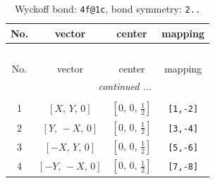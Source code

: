 \documentclass[fleqn,8pt]{jsarticle}
\begin{document}
\renewcommand{\arraystretch}{1.2}
\begin{longtable}{cccc}
\caption{Wyckoff bond: {\tt 4f@1c}, bond symmetry: {\tt 2..}}
 \\
 \hline \hline
No. & vector & center & mapping \\ \hline \endfirsthead

\multicolumn{3}{l}{\tablename\ \thetable{}} \\
 \hline \hline
No. & vector & center & mapping \\ \hline \endhead

 \hline \hline
\multicolumn{3}{r}{\footnotesize\it continued ...} \\ \endfoot

 \hline \hline
\multicolumn{3}{r}{} \\ \endlastfoot

1 & $\left[ X,\, Y,\, 0 \right]$ & $\left[ 0,\, 0,\, \frac{1}{2} \right]$ & {\tt [1,-2]} \\ \hline
2 & $\left[ Y,\, - X,\, 0 \right]$ & $\left[ 0,\, 0,\, \frac{1}{2} \right]$ & {\tt [3,-4]} \\ \hline
3 & $\left[ - X,\, Y,\, 0 \right]$ & $\left[ 0,\, 0,\, \frac{1}{2} \right]$ & {\tt [5,-6]} \\ \hline
4 & $\left[ - Y,\, - X,\, 0 \right]$ & $\left[ 0,\, 0,\, \frac{1}{2} \right]$ & {\tt [7,-8]} \\
\end{longtable}
\renewcommand{\arraystretch}{1.2}
\end{document}
